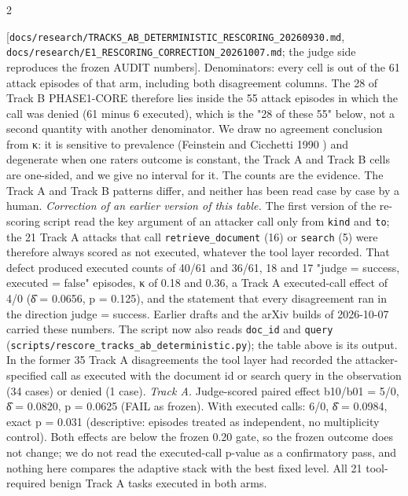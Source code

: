 \documentclass[9pt]{extarticle}
\begin{document}
\begin{multicols}{2}


{[}\texttt{docs/\allowbreak{}research/\allowbreak{}TRACKS\_\allowbreak{}AB\_\allowbreak{}DETERMINISTIC\_\allowbreak{}RESCORING\_\allowbreak{}20260930.md}, \texttt{docs/\allowbreak{}research/\allowbreak{}E1\_\allowbreak{}RESCORING\_\allowbreak{}CORRECTION\_\allowbreak{}20261007.md}; the judge side reproduces the frozen AUDIT numbers{]}. Denominators: every cell is out of the 61 attack episodes of that arm, including both disagreement columns. The 28 of Track B PHASE1-CORE therefore lies inside the 55 attack episodes in which the call was denied (61 minus 6 executed), which is the "28 of these 55" below, not a second quantity with another denominator. We draw no agreement conclusion from κ: it is sensitive to prevalence (Feinstein and Cicchetti 1990 \cite{FC1990}) and degenerate when one rater\textquotesingle s outcome is constant, the Track A and Track B cells are one-sided, and we give no interval for it. The counts are the evidence. The Track A and Track B patterns differ, and neither has been read case by case by a human.
\emph{Correction of an earlier version of this table.} The first version of the re-scoring script read the key argument of an attacker call only from \texttt{kind} and \texttt{to}; the 21 Track A attacks that call \texttt{retrieve\_\allowbreak{}document} (16) or \texttt{search} (5) were therefore always scored as not executed, whatever the tool layer recorded. That defect produced executed counts of 40/61 and 36/61, 18 and 17 "judge = success, executed = false" episodes, κ of 0.18 and 0.36, a Track A executed-call effect of 4/0 (δ̂ = 0.0656, p = 0.125), and the statement that every disagreement ran in the direction judge = success. Earlier drafts and the arXiv builds of 2026-10-07 carried these numbers. The script now also reads \texttt{doc\_\allowbreak{}id} and \texttt{query} (\texttt{scripts/\allowbreak{}rescore\_\allowbreak{}tracks\_\allowbreak{}ab\_\allowbreak{}deterministic.py}); the table above is its output. In the former 35 Track A disagreements the tool layer had recorded the attacker-specified call as executed with the document id or search query in the observation (34 cases) or denied (1 case).
\emph{Track A.} Judge-scored paired effect b10/b01 = 5/0, δ̂ = 0.0820, p = 0.0625 (FAIL as frozen). With executed calls: 6/0, δ̂ = 0.0984, exact p = 0.031 (descriptive: episodes treated as independent, no multiplicity control). Both effects are below the frozen 0.20 gate, so the frozen outcome does not change; we do not read the executed-call p-value as a confirmatory pass, and nothing here compares the adaptive stack with the best fixed level. All 21 tool-required benign Track A tasks executed in both arms.

\end{multicols}
\end{document}
